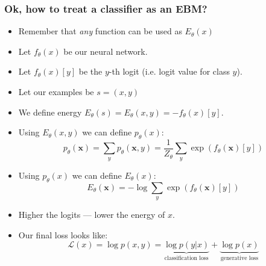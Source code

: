 \documentclass[10pt]{beamer}
\begin{document}
\begin{frame}
    \frametitle{Ok, how to treat a classifier as an EBM?}
    
    
    \begin{itemize}
        \item\pause Remember that \textit{any} function can be used as $E_\theta(x)$
        \item\pause Let $f_\theta(x)$ be our neural network.
        \item\pause Let $f_\theta(x)[y]$ be the $y$-th logit (i.e. logit value for class $y$).
        \item\pause Let our examples be $s = (x,y)$
        \item\pause We define energy $E_\theta(s) = E_\theta(x,y) = -f_\theta(x)[y]$.
        \item\pause Using $E_\theta(x,y)$ we can define $p_\theta(x)$:
        \begin{equation}
p_{\theta}(\mathbf{x})=\sum_{y} p_{\theta}(\mathbf{x}, y)=\frac{1}{Z_\theta}\sum_{y} \exp \left(f_{\theta}(\mathbf{x})[y]\right)
\end{equation}
        \item\pause Using $p_\theta(x)$ we can define $E_\theta(x)$:
        \begin{equation}
E_{\theta}(\mathbf{x})=-\log \sum_{y} \exp \left(f_{\theta}(\mathbf{x})[y]\right)
\end{equation}
        \item\pause Higher the logits --- lower the energy of $x$.
        \item\pause Our final loss looks like:
        \begin{equation}
            \mathcal{L}(x) = \log p(x,y) = \underbrace{\log p(y|x)}_\text{classification loss} + \underbrace{\log p(x)}_\text{generative loss}
        \end{equation}
    \end{itemize}
\end{frame}
\end{document}
